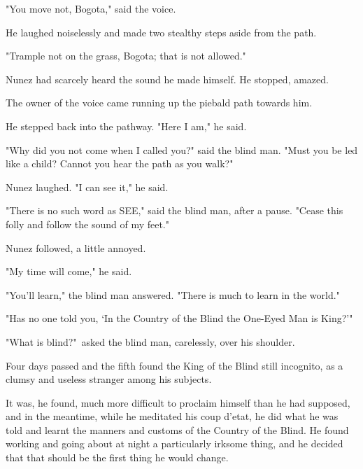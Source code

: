 \documentclass[courier]{sffms}
\begin{document}
"You move not, Bogota," said the voice.

He laughed noiselessly and made two stealthy steps aside from the
path.

"Trample not on the grass, Bogota; that is not allowed."

Nunez had scarcely heard the sound he made himself. He stopped,
amazed.

The owner of the voice came running up the piebald path towards him.

He stepped back into the pathway. "Here I am," he said.

"Why did you not come when I called you?" said the blind man. "Must
you be led like a child? Cannot you hear the path as you walk?"

Nunez laughed. "I can see it," he said.

"There is no such word as SEE," said the blind man, after a
pause. "Cease this folly and follow the sound of my feet."

Nunez followed, a little annoyed.

"My time will come," he said.

"You'll learn," the blind man answered. "There is much to learn in the
world."

"Has no one told you, `In the Country of the Blind the One-Eyed Man is
King?'"

"What is blind?"\ asked the blind man, carelessly, over his shoulder.

Four days passed and the fifth found the King of the Blind still
incognito, as a clumsy and useless stranger among his subjects.

It was, he found, much more difficult to proclaim himself than he had
supposed, and in the meantime, while he meditated his coup d'etat, he
did what he was told and learnt the manners and customs of the Country
of the Blind. He found working and going about at night a particularly
irksome thing, and he decided that that should be the first thing he
would change.
\end{document}
